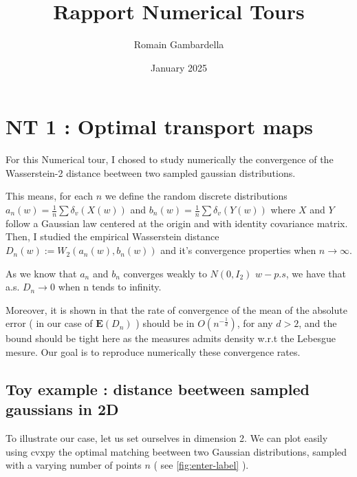 \documentclass[a4paper,11pt]{article}
\title{Rapport Numerical Tours}
\author{Romain Gambardella}
\date{January 2025}
\begin{document}
\maketitle

\section{NT 1 : Optimal transport maps}

For this Numerical tour, I chosed to study numerically the convergence of the Wasserstein-2 distance beetween two sampled gaussian distributions.

This means, for each $n$ we define the random discrete distributions $a_n(w) = \frac{1}{n} \sum{\delta_v(X(w))}$ and  $b_n(w) = \frac{1}{n} \sum{\delta_v(Y(w))}$ where $X$ and $Y$ follow a Gaussian law centered at the origin and with identity covariance matrix. Then, I studied the empirical Wasserstein distance $D_n(w) := W_2(a_n(w), b_n(w))$ and it's convergence properties when $n \rightarrow \infty$.

As we know that $a_n$ and $b_n$ converges weakly to $N(0,I_2)$ $w-p.s$, we have that a.s. $D_n \rightarrow 0$ when n tends to infinity.

Moreover, it is shown in \cite{Dud} that the rate of convergence of the mean of the absolute error ( in our case of $\mathbf{E}(D_n)$ ) should be in $O(n^{-\frac{1}{d}})$, for any $d >2$, and the bound should be tight here as the measures admits density w.r.t the Lebesgue mesure. Our goal is to reproduce numerically these convergence rates.

\subsection{Toy example : distance beetween sampled gaussians in 2D}

To illustrate our case, let us set ourselves in dimension 2. We can plot easily using cvxpy the optimal matching beetween two Gaussian distributions, sampled with a varying number of points $n$ ( see \ref{fig:enter-label} ).
\end{document}
